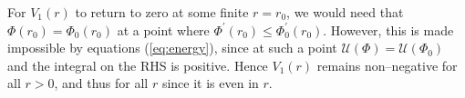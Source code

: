 For $V_1(r)$ to return to zero at some finite $r=r_0$, we would need that $\Phi(r_0)=\Phi_0(r_0)$ at a point where $\Phi^\prime(r_0)\leq\Phi_0^\prime(r_0)$. However, this is made impossible by equations (\ref{eq:energy}), since at such a point $\mathcal{U}(\Phi)=\mathcal{U}(\Phi_0)$ and the integral on the RHS is positive. Hence $V_1(r)$ remains non--negative for all $r>0$, and thus for all $r$ since it is even in $r$.
\koniec







